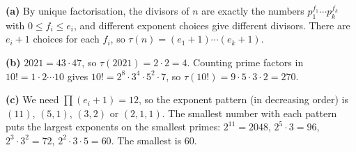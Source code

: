 \textbf{(a)} By unique factorisation, the divisors of $n$ are exactly the numbers $p_1^{f_1}\cdots p_k^{f_k}$ with $0\le f_i\le e_i$, and different exponent choices give different divisors. There are $e_i+1$ choices for each $f_i$, so $\tau(n)=(e_1+1)\cdots(e_k+1)$.

\textbf{(b)} $2021=43\cdot47$, so $\tau(2021)=2\cdot2=\boxed{4}$. Counting prime factors in $10!=1\cdot2\cdots10$ gives $10!=2^8\cdot3^4\cdot5^2\cdot7$, so $\tau(10!)=9\cdot5\cdot3\cdot2=\boxed{270}$.

\textbf{(c)} We need $\prod(e_i+1)=12$, so the exponent pattern (in decreasing order) is $(11)$, $(5,1)$, $(3,2)$ or $(2,1,1)$. The smallest number with each pattern puts the largest exponents on the smallest primes: $2^{11}=2048$, $2^5\cdot3=96$, $2^3\cdot3^2=72$, $2^2\cdot3\cdot5=60$. The smallest is $\boxed{60}$.
